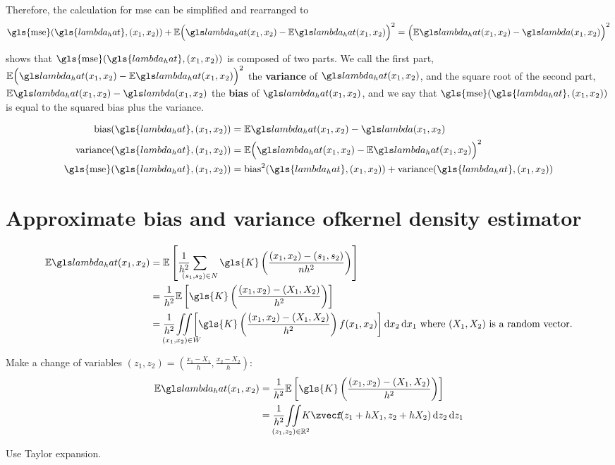 Therefore, the calculation for \gls{mse} can be simplified and rearranged to 
\begin{equation}
    \label{eq:mse:biasvariance}
    \mbox{\gls{mse}}(\gls{lambda_hat}, \xvec)
        + \E \Big( \lmbdhat - \E\lmbdhat \Big)^2
        = \Big( \E\lmbdhat - \lmbd \Big)^2 
\end{equation}

 shows that $\mbox{\gls{mse}}(\gls{lambda_hat}, \xvec)$
is composed of two parts.
We call the first part, $\E \Big( \lmbdhat - \E\lmbdhat \Big)^2$ the \textbf{variance} of $\lmbdhat$,
and the square root of the second part, $\E\lmbdhat - \lmbd$ the \textbf{bias} of $\lmbdhat$,
and we say that $\mbox{\gls{mse}}(\gls{lambda_hat}, \xvec)$ is equal to the squared bias plus the variance.

\begin{align}
    \mbox{bias}(\gls{lambda_hat}, \xvec) & = \E\lmbdhat - \lmbd \label{eq:estimator:bias} \\
    \mbox{variance}(\gls{lambda_hat}, \xvec) & = \E \Big( \lmbdhat - \E\lmbdhat \Big)^2 \label{eq:estimator:variance} \\
    \mbox{\gls{mse}}(\gls{lambda_hat}, \xvec) & = \mbox{bias}^2 (\gls{lambda_hat}, \xvec) + \mbox{variance} (\gls{lambda_hat}, \xvec) \label{eq:estimator:mse} 
\end{align}

\section{Approximate bias and variance ofkernel density estimator}
\label{sec:derivations:biasvariancekernel}

\begin{align}
    \E \lmbdhat
        &= \E \left[ \sumS{\gls{K}\left(\frac{\xvec-(s_1, s_2)}{n h^2}\right)} \right] \nonumber \\%
        &= \frac{1}{h^2} \E%
                \left[%
                    \gls{K}\left(\frac{\xvec-(X_1, X_2)}{h^2}\right)%
                \right] \nonumber \\%
        &= \frac{1}{h^2} \iintW{%
                \left[%
                    \gls{K}\left(\frac{\xvec-(X_1, X_2)}{h^2}\right)f(x_1, x_2)%
                \right]}%
            ~\text{where}~(X_1,X_2)~\text{is a random vector.} \nonumber%
\end{align}

Make a change of variables
$(z_1, z_2) = \left( \frac{x_1-X_1}{h},\frac{x_2-X_2}{h} \right)$:
\begin{align}
    \E \lmbdhat%
        &= \frac{1}{h^2} \E%
                \left[%
                    \gls{K}\left(\frac{\xvec-(X_1, X_2)}{h^2}\right)%
                \right] \\%
        &= \frac{1}{h^2} \iintRZ{%
            K \zvec%
            f\!\!\left(z_1 + h X_1, z_2 + h X_2\right)%
        }%
\end{align}

Use Taylor expansion.


